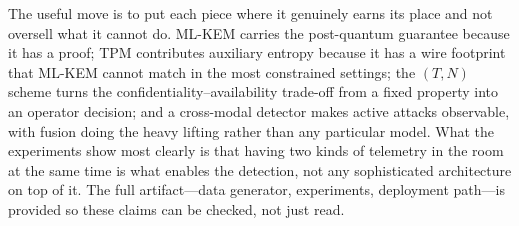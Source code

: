 \documentclass[conference]{IEEEtran}
\begin{document}
The useful move is to put each piece where it genuinely earns its place and not
oversell what it cannot do. ML-KEM carries the post-quantum guarantee because it has
a proof; TPM contributes auxiliary entropy because it has a wire footprint that ML-KEM
cannot match in the most constrained settings; the $(T,N)$ scheme turns the
confidentiality--availability trade-off from a fixed property into an operator
decision; and a cross-modal detector makes active attacks observable, with fusion
doing the heavy lifting rather than any particular model. What the experiments show
most clearly is that having two kinds of telemetry in the room at the same time is
what enables the detection, not any sophisticated architecture on top of it. The full
artifact---data generator, experiments, deployment path---is provided so these claims
can be checked, not just read.



\end{document}
